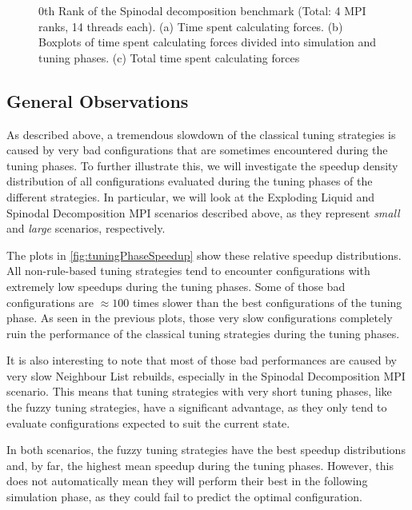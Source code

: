 \begin{figure}[H]
    \caption[Spinodal decomposition benchmark MPI with 14 threads]{0th Rank of the Spinodal decomposition benchmark (Total: 4 MPI ranks, 14 threads each). (a) Time spent calculating forces. (b) Boxplots of time spent calculating forces divided into simulation and tuning phases. (c) Total time spent calculating forces}
    \label{fig:spinodal_14thread}
\end{figure}



\subsection{General Observations}

As described above, a tremendous slowdown of the classical tuning strategies is caused by very bad configurations that are sometimes encountered during the tuning phases. To further illustrate this, we will investigate the speedup density distribution of all configurations evaluated during the tuning phases of the different strategies. In particular, we will look at the Exploding Liquid and Spinodal Decomposition MPI scenarios described above, as they represent \emph{small} and \emph{large} scenarios, respectively.

The plots in \autoref{fig:tuningPhaseSpeedup} show these relative speedup distributions. All non-rule-based tuning strategies tend to encounter configurations with extremely low speedups during the tuning phases. Some of those bad configurations are $\approx100$ times slower than the best configurations of the tuning phase. As seen in the previous plots, those very slow configurations completely ruin the performance of the classical tuning strategies during the tuning phases.

It is also interesting to note that most of those bad performances are caused by very slow Neighbour List rebuilds, especially in the Spinodal Decomposition MPI scenario. This means that tuning strategies with very short tuning phases, like the fuzzy tuning strategies, have a significant advantage, as they only tend to evaluate configurations expected to suit the current state.

In both scenarios, the fuzzy tuning strategies have the best speedup distributions and, by far, the highest mean speedup during the tuning phases. However, this does not automatically mean they will perform their best in the following simulation phase, as they could fail to predict the optimal configuration.

\newpage

